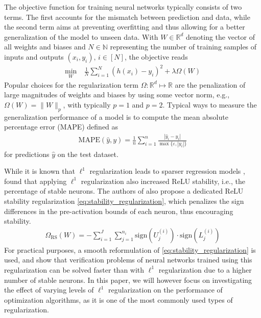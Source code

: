 The objective function for training neural networks typically consists of two terms. The first 
accounts for the mismatch between prediction and data, while the second term aims at preventing overfitting and thus allowing for a better generalization of the model to unseen data. With $W \in \mathbb{R}^d$ denoting the vector of all weights and biases and $N \in  \mathbb{N}$ representing the number of training samples of inputs and outputs $(x_i, y_i), \, i \in [N]$, the objective reads
%
\begin{equation}\label{prob:training}
    \begin{aligned}
        \min_{W}\ & \frac{1}{N} \sum_{i=1}^{N} \left( h(x_i) -y_i\right)^2 + \lambda \Omega(W)
    \end{aligned}
\end{equation}
%
Popular choices for the regularization term $\Omega : \mathbb{R}^d \mapsto \mathbb{R}$ are the penalization of large magnitudes of weights and biases by using some vector norm, e.g., $\Omega(W) = \| W \|_p$, with typically $p=1$ and $p=2$. Typical ways to measure the generalization performance of a model is to compute the mean absolute percentage error (MAPE) defined as 
\begin{align}
    \text{MAPE}\left(\hat{y}, y\right) = \frac{1}{n} \sum_{i=1}^{n} \frac{|\hat{y}_i - y_i|}{\max\{\varepsilon, |y_i|\}}
\end{align}
for predictions $\hat{y}$ on the test dataset.

While it is known that $\ell^1$ regularization leads to sparser regression models \citep{Tibshirani1996}, \citet{Xiao2019,Serra2020} found that applying $\ell^1$ regularization also increased ReLU stability, i.e., the percentage of stable neurons. The authors of \citet{Xiao2019} also propose a dedicated ReLU stability regularization \eqref{eq:stability_regularization}, which penalizes the sign differences in the pre-activation bounds of each neuron, thus encouraging stability.
\begin{align}\label{eq:stability_regularization}
    \Omega_{\text{RS}}(W) = - \sum_{i=1}^{J} \sum_{j=1}^{n_i} \text{sign}(U_j^{(i)}) \cdot \text{sign}(L_j^{(i)})
\end{align}
For practical purposes, a smooth reformulation of \eqref{eq:stability_regularization} is used, and \citet{Xiao2019} show that verification problems of neural networks trained using this regularization can be solved faster than with $\ell^1$ regularization due to a higher number of stable neurons. In this paper, we will however focus on investigating the effect of varying levels of $\ell^1$ regularization on the performance of optimization algorithms, as it is one of the most commonly used types of regularization.

